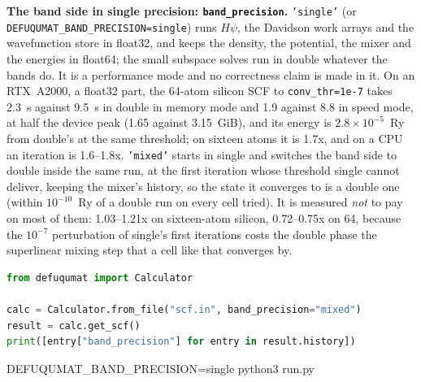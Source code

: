 \documentclass[11pt,a4paper]{article}
\newcommand{\code}[1]{\texttt{\small #1}}
\begin{document}
\textbf{The band side in single precision: \code{band\_precision}.} \code{'single'}
(or \code{DEFUQUMAT\_BAND\_PRECISION=single}) runs $H\psi$, the Davidson work arrays
and the wavefunction store in float32, and keeps the density, the potential, the
mixer and the energies in float64; the small subspace solves run in double
whatever the bands do. It is a performance mode and no correctness claim is made
in it. On an RTX~A2000, a float32 part, the 64-atom silicon SCF to
\code{conv\_thr=1e-7} takes 2.3~s against 9.5~s in double in memory mode and 1.9
against 8.8 in speed mode, at half the device peak (1.65 against 3.15~GiB), and
its energy is $2.8\times10^{-5}$~Ry from double's at the same threshold; on sixteen
atoms it is 1.7x, and on a CPU an iteration is 1.6--1.8x. \code{'mixed'} starts in single and switches the band side to double
inside the same run, at the first iteration whose threshold single cannot deliver,
keeping the mixer's history, so the state it converges to is a double one (within
$10^{-10}$~Ry of a double run on every cell tried). It is measured \emph{not} to pay
on most of them: 1.03--1.21x on sixteen-atom silicon, 0.72--0.75x on 64, because
the $10^{-7}$ perturbation of single's first iterations costs the double phase the
superlinear mixing step that a cell like that converges by.

\begin{lstlisting}[language=Python]
from defuqumat import Calculator

calc = Calculator.from_file("scf.in", band_precision="mixed")
result = calc.get_scf()
print([entry["band_precision"] for entry in result.history])
\end{lstlisting}

\begin{shcode}
DEFUQUMAT_BAND_PRECISION=single python3 run.py
\end{shcode}
\end{document}
